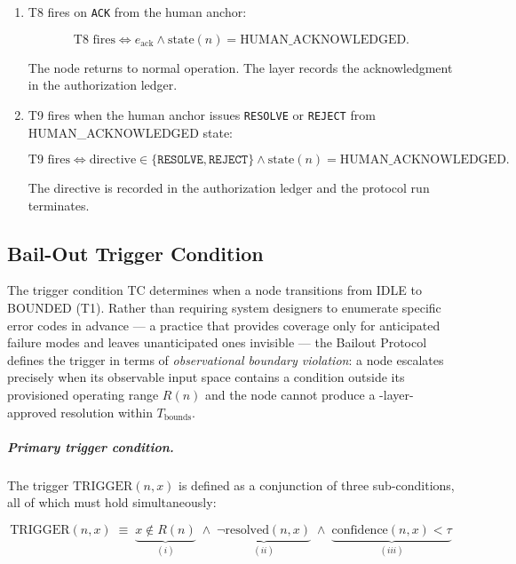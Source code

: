 \begin{enumerate}
\item[\textbf{T8 (HUMAN\_ACKNOWLEDGED $\rightarrow$ IDLE).}] T8 fires on \texttt{ACK} from the human anchor:

\begin{equation}
\text{T8 fires} \iff e_{\text{ack}} \land \text{state}(n) = \text{HUMAN\_ACKNOWLEDGED}. \tag{T8}
\end{equation}

The node returns to normal operation. The \fact{} layer records the acknowledgment in the authorization ledger.

\item[\textbf{T9 (HUMAN\_ACKNOWLEDGED $\rightarrow$ RESOLVED via directive).}] T9 fires when the human anchor issues \texttt{RESOLVE} or \texttt{REJECT} from HUMAN\_ACKNOWLEDGED state:

\begin{equation}
\text{T9 fires} \iff \text{directive} \in \{\texttt{RESOLVE}, \texttt{REJECT}\} \land \text{state}(n) = \text{HUMAN\_ACKNOWLEDGED}. \tag{T9}
\end{equation}

The directive is recorded in the authorization ledger and the protocol run terminates.
\end{enumerate}

\subsection{Bail-Out Trigger Condition}\label{sec:bailout-trigger}

The trigger condition TC determines when a node transitions from IDLE to BOUNDED (T1). Rather than requiring system designers to enumerate specific error codes in advance — a practice that provides coverage only for anticipated failure modes and leaves unanticipated ones invisible — the Bailout Protocol defines the trigger in terms of \emph{observational boundary violation}: a node escalates precisely when its observable input space contains a condition outside its provisioned operating range $R(n)$ and the node cannot produce a \fact-layer-approved resolution within $T_{\text{bounds}}$.

\subparagraph{Primary trigger condition.} The trigger $\text{TRIGGER}(n, x)$ is defined as a conjunction of three sub-conditions, all of which must hold simultaneously:

\begin{equation}
\text{TRIGGER}(n, x) \;\equiv\; \underbrace{x \notin R(n)}_{(i)} \;\land\; \underbrace{\neg\text{resolved}(n, x)}_{(ii)} \;\land\; \underbrace{\text{confidence}(n, x) < \tau}_{(iii)} \tag{TC}\label{eq:trigger-condition}
\end{equation}

